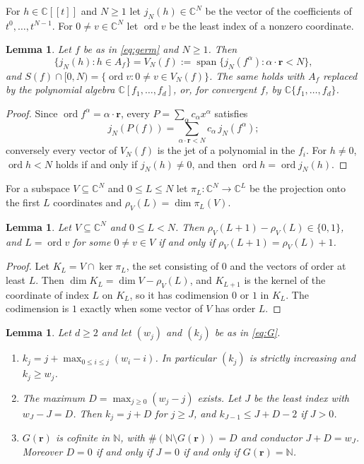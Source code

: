 \documentclass{amsart}
\newtheorem{lemma}[theorem]{Lemma}
\theoremstyle{definition}
\numberwithin{equation}{section}
\newcommand{\N}{\mathbb{N}}
\newcommand{\C}{\mathbb{C}}
\newcommand{\bfr}{\mathbf{r}}
\newcommand{\ord}{\operatorname{ord}}
\begin{document}
For $h\in\C[[t]]$ and $N\ge1$ let $j_N(h)\in\C^N$ be the vector of the
coefficients of $t^0,\dots,t^{N-1}$. For $0\ne v\in\C^N$ let $\ord v$ be the
least index of a nonzero coordinate.

\begin{lemma}\label{lem:jets}
Let $f$ be as in \eqref{eq:germ} and $N\ge1$. Then
\[
  \{j_N(h):h\in A_f\}=V_N(f):=\operatorname{span}\{j_N(f^\alpha):\alpha\cdot
  \bfr<N\},
\]
and $S(f)\cap[0,N)=\{\ord v:0\ne v\in V_N(f)\}$. The same holds with $A_f$
replaced by the polynomial algebra $\C[f_1,\dots,f_d]$, or, for convergent $f$,
by $\C\{f_1,\dots,f_d\}$.
\end{lemma}

\begin{proof}
Since $\ord f^\alpha=\alpha\cdot\bfr$, every $P=\sum_\alpha c_\alpha x^\alpha$
satisfies
\[
  j_N(P(f))=\sum_{\alpha\cdot\bfr<N}c_\alpha\, j_N(f^\alpha);
\]
conversely
every vector of $V_N(f)$ is the jet of a polynomial in the $f_i$. For $h\ne0$,
$\ord h<N$ holds if and only if $j_N(h)\ne0$, and then $\ord h=\ord j_N(h)$.
\end{proof}

For a subspace $V\subseteq\C^N$ and $0\le L\le N$ let $\pi_L:\C^N\to\C^L$ be the
projection onto the first $L$ coordinates and $\rho_V(L)=\dim\pi_L(V)$.

\begin{lemma}\label{lem:prefix}
Let $V\subseteq\C^N$ and $0\le L<N$. Then $\rho_V(L+1)-\rho_V(L)\in\{0,1\}$, and
$L=\ord v$ for some $0\ne v\in V$ if and only if $\rho_V(L+1)=\rho_V(L)+1$.
\end{lemma}

\begin{proof}
Let $K_L=V\cap\ker\pi_L$, the set consisting of $0$ and the vectors of order at
least $L$. Then $\dim K_L=\dim V-\rho_V(L)$, and $K_{L+1}$ is the kernel of the
coordinate of index $L$ on $K_L$, so it has codimension $0$ or $1$ in $K_L$. The
codimension is $1$ exactly when some vector of $V$ has order $L$.
\end{proof}

\begin{lemma}\label{lem:greedy}
Let $d\ge2$ and let $(w_j)$ and $(k_j)$ be as in \eqref{eq:G}.
\begin{enumerate}[label=\textup{(\alph*)}]
\item $k_j=j+\max_{0\le i\le j}(w_i-i)$. In particular $(k_j)$ is strictly
  increasing and $k_j\ge w_j$.
\item The maximum $D=\max_{j\ge0}(w_j-j)$ exists. Let $J$ be the least index
  with $w_J-J=D$. Then $k_j=j+D$ for $j\ge J$, and $k_{J-1}\le J+D-2$ if $J>0$.
\item $G(\bfr)$ is cofinite in $\N$, with $\#(\N\setminus G(\bfr))=D$ and
  conductor $J+D=w_J$. Moreover $D=0$ if and only if $J=0$ if and only if
  $G(\bfr)=\N$.
\end{enumerate}
\end{lemma}
\end{document}
